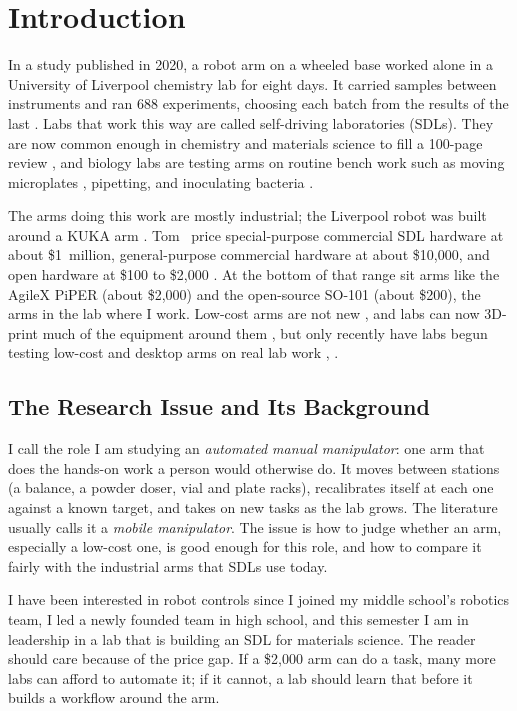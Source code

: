 \section{Introduction}

In a study published in 2020, a robot arm on a wheeled base worked alone in a University of
Liverpool chemistry lab for eight days. It carried samples between instruments and ran 688 experiments, choosing each
batch from the results of the last \cite{burger2020}. Labs that work this way are called
self-driving laboratories (SDLs). They are now common enough in chemistry and materials science
to fill a 100-page review \cite{tom2024}, and biology labs are testing arms on routine bench
work such as moving microplates \cite{harazono2024}, pipetting, and inoculating bacteria
\cite{rupp2022}.

The arms doing this work are mostly industrial; the Liverpool robot was built around a KUKA
arm \cite{burger2020}. Tom \etal\ price special-purpose commercial SDL hardware at about
\$1~million, general-purpose commercial hardware at about \$10{,}000, and open hardware at
\$100 to \$2{,}000 \cite{tom2024}. At the bottom of that range sit arms like the AgileX PiPER
(about \$2{,}000) and the open-source SO-101 (about \$200), the arms in the lab where I work.
Low-cost arms are not new \cite{quigley2011}, and labs can now 3D-print much of the equipment
around them \cite{doloi2025}, but only recently have labs begun testing low-cost and desktop arms
on real lab work \cite{harazono2024}, \cite{rupp2022}.

\subsection{The Research Issue and Its Background}

I call the role I am studying an \emph{automated manual manipulator}: one arm that does the
hands-on work a person would otherwise do. It moves between stations (a balance, a powder
doser, vial and plate racks), recalibrates itself at each one against a known target, and takes
on new tasks as the lab grows. The literature usually calls it a \emph{mobile manipulator}. The
issue is how to judge whether an arm, especially a low-cost one, is good enough for this role,
and how to compare it fairly with the industrial arms that SDLs use today.

I have been interested in robot controls since I joined my middle school's robotics team, I
led a newly founded team in high school, and this semester I am in leadership in a lab that is
building an SDL for materials science. The reader should care because of the price gap. If a
\$2{,}000 arm can do a task, many more labs can afford to automate it; if it cannot, a lab
should learn that before it builds a workflow around the arm.

